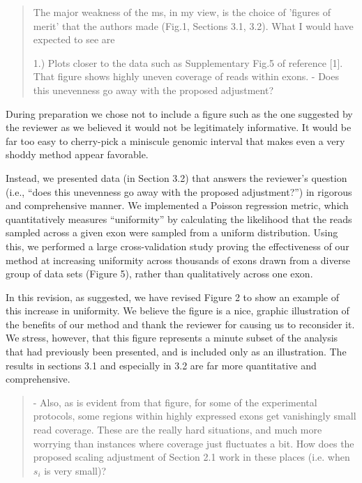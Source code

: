 \documentclass{article}
\begin{document}
\begin{quote}
The major weakness of the ms, in my view, is the choice of 'figures of
merit' that the authors made (Fig.1, Sections 3.1, 3.2). What I would
have expected to see are

1.) Plots closer to the data such as Supplementary Fig.5 of
reference [1]. That figure shows highly uneven coverage of reads
within exons.
- Does this unevenness go away with the proposed adjustment?
\end{quote}

During preparation we chose not to include a figure such as the one suggested
by the reviewer as we believed it would not be legitimately informative. It
would be far too easy to cherry-pick a miniscule genomic interval that makes
even a very shoddy method appear favorable.

Instead, we presented data (in Section 3.2) that answers the reviewer's question
(i.e., ``does this unevenness go away with the proposed adjustment?'') in
rigorous and comprehensive manner. We implemented a Poisson regression metric,
which quantitatively measures ``uniformity'' by calculating the likelihood that
the reads sampled across a given exon were sampled from a uniform distribution.
Using this, we performed a large cross-validation study proving the
effectiveness of our method at increasing uniformity across thousands of exons
drawn from a diverse group of data sets (Figure 5), rather than qualitatively
across one exon.

In this revision, as suggested, we have revised Figure 2 to show an
example of this increase in uniformity.  We believe the figure is a
nice, graphic illustration of the benefits of our method and thank the
reviewer for causing us to reconsider it.  We stress, however, that
this figure represents a minute subset of the analysis that had
previously been presented, and is included only as an illustration.
The results in sections 3.1 and especially in 3.2 are far more
quantitative and comprehensive.

\begin{quote}
- Also, as is evident from that figure, for some of the experimental
protocols, some regions within highly expressed exons get vanishingly
small read coverage.  These are the really hard situations, and much
more worrying than instances where coverage just fluctuates a bit.
How does the proposed scaling adjustment of Section 2.1 work in these
places (i.e. when $s_{i}$ is very small)?
\end{quote}
\end{document}
